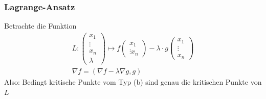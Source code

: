 \subsubsection{Lagrange-Ansatz}
Betrachte die Funktion
\begin{gather*}
	L: \begin{pmatrix} x_1 \\ \vdots \\ x_n \\ \lambda \end{pmatrix} \mapsto f\begin{pmatrix} x_1 \\ \vdots x_n \end{pmatrix} - \lambda \cdot g\begin{pmatrix} x_1 \\ \vdots \\ x_n \end{pmatrix} \\
	\nabla f = ( \nabla f - \lambda\nabla g , g )
\end{gather*}
Also: Bedingt kritische Punkte vom Typ (b) sind genau die kritischen Punkte von $L$
